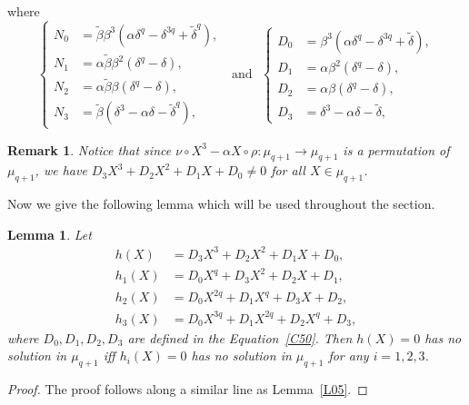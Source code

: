 \documentclass[12pt]{amsart}
\newtheorem{lem}[thm]{Lemma}
\newtheorem{rmk}[thm]{Remark}
\numberwithin{equation}{section}
\theoremstyle{definition}
\begin{document}
 where
 \begin{equation}\label{C50}
  \begin{cases}
    N_0 &= {\tilde \beta}\beta^3 (\alpha \delta^q- \delta^{3q}+ {\tilde \delta}^q),\\
    N_1 &= \alpha {\tilde \beta} \beta^2 (\delta^q -\delta),\\
    N_2 &= \alpha {\tilde \beta} \beta (\delta^q -\delta),\\
    N_3 &= {\tilde \beta}(\delta^3-\alpha \delta - {\tilde \delta}^q),
  \end{cases}
  ~~~\mbox{and}~~~
  \begin{cases}
   D_0 &= \beta^3 (\alpha \delta^q- \delta^{3q}+ {\tilde \delta}),\\
    D_1 &= \alpha \beta^2 (\delta^q -\delta),\\
    D_2 &= \alpha \beta (\delta^q -\delta),\\
    D_3 &= \delta^3-\alpha \delta - {\tilde \delta},
  \end{cases}
 \end{equation}

 \begin{rmk}\label{R50}
  Notice that since $ {\nu} \circ X^3-\alpha X  \circ \rho: \mu_{q+1} \rightarrow \mu_{q+1}$ is a permutation of $\mu_{q+1}$, we have $D_3X^3+D_2X^2+D_1X+D_0 \neq 0$ for all $X \in \mu_{q+1}$.
 \end{rmk}

 Now we give the following lemma which will be used throughout the section.

 \begin{lem} \label{L550}
 Let
\begin{equation*}
 \begin{split}
  h(X)&=D_3X^3 +D_2X^2+D_1X+D_0,\\
  h_1(X) &= D_0X^q+D_3X^2 +D_2X+D_1,\\
  h_2(X) &=D_0X^{2q}+D_1X^q+D_3X+D_2,\\
  h_3(X) &=D_0X^{3q}+D_1X^{2q}+D_2X^q+D_3,
 \end{split}
\end{equation*}
where $D_0,D_1, D_2, D_3$ are defined in the Equation~\eqref{C50}. Then
 $h(X)=0$ has no solution in $\mu_{q+1}$ iff  $h_i(X)=0$ has no solution in $\mu_{q+1}$ for any $i=1,2,3$.
\end{lem}
\begin{proof}
 The proof follows along a similar line as Lemma~\ref{L05}. 
\end{proof}
\end{document}
